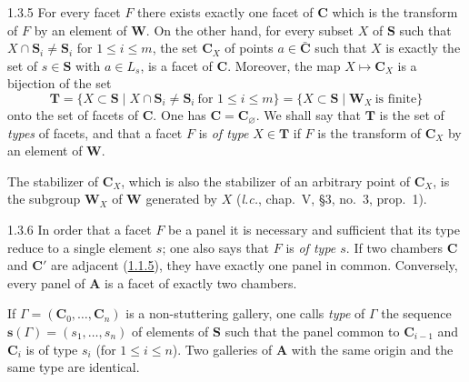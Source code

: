 \documentclass[12pt,a4paper,oneside,english]{smfart}
\makeatletter
\newcommand{\btanchor}[1]{\leavevmode\Hy@raisedlink{\hypertarget{bt:#1}{}}}
\newcommand{\btref}[1]{\hyperlink{bt:#1}{#1}}
\theoremstyle{definition}
\theoremstyle{bt}
\makeatother
\begin{document}
\num{1.3.5}\btanchor{1.3.5} For every facet $F$ there exists exactly one facet of $\mathbf{C}$
which is the transform of $F$ by an element of $\mathbf{W}$. On the other hand, for every subset $X$ of $\mathbf{S}$ such that $X\cap\mathbf{S}_i\neq\mathbf{S}_i$ for $1\leqslant i\leqslant m$, the set $\mathbf{C}_X$ of points $a\in\bar{\mathbf{C}}$ such that $X$ is exactly the set of $s\in\mathbf{S}$ with $a\in L_s$, is a facet of $\mathbf{C}$. Moreover, the map $X\mapsto\mathbf{C}_X$ is a bijection of the set
\[
  \mathbf{T}=\{X\subset\mathbf{S}\mid
     X\cap\mathbf{S}_i\neq\mathbf{S}_i\ \text{for }1\leqslant i\leqslant m\}
   =\{X\subset\mathbf{S}\mid \mathbf{W}_X\ \text{is finite}\}
\]
onto the set of facets of $\mathbf{C}$. One has $\mathbf{C}=\mathbf{C}_{\varnothing}$. We shall say that $\mathbf{T}$ is the set of \emph{types} of facets, and that a facet $F$ is \emph{of type} $X\in\mathbf{T}$ if $F$ is the transform of $\mathbf{C}_X$ by an element of $\mathbf{W}$.

The stabilizer of $\mathbf{C}_X$, which is also the stabilizer of an arbitrary point of $\mathbf{C}_X$, is the subgroup $\mathbf{W}_X$ of $\mathbf{W}$ generated by $X$ (\emph{l.c.}, chap.~V, \S3, no.~3, prop.~1).

\num{1.3.6}\btanchor{1.3.6} In order that a facet $F$ be a panel it is necessary and
sufficient that its type reduce to a single element $s$; one also says that $F$ is \emph{of type $s$}. If two chambers $\mathbf{C}$ and $\mathbf{C}'$ are adjacent (\btref{1.1.5}), they have exactly one panel in common. Conversely, every panel of $\mathbf{A}$ is a facet of exactly two chambers.

If $\Gamma=(\mathbf{C}_0,\dots,\mathbf{C}_n)$ is a non-stuttering gallery, one calls \emph{type} of $\Gamma$ the sequence $\mathbf{s}(\Gamma)=(s_1,\dots,s_n)$ of elements of $\mathbf{S}$ such that the panel common to $\mathbf{C}_{i-1}$ and $\mathbf{C}_i$ is of type $s_i$ (for $1\leqslant i\leqslant n$). Two galleries of $\mathbf{A}$ with the same origin and the same type are identical.
\end{document}
